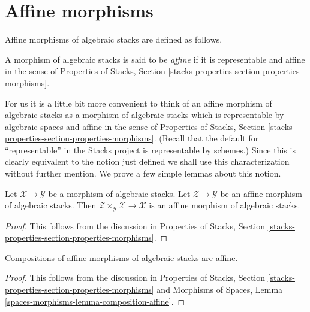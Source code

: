 \section{Affine morphisms}
\label{section-affine}

\noindent
Affine morphisms of algebraic stacks are defined as follows.

\begin{definition}
\label{definition-affine}
A morphism of algebraic stacks is said to be {\it affine}
if it is representable and affine in the sense of
Properties of Stacks, Section
\ref{stacks-properties-section-properties-morphisms}.
\end{definition}

\noindent
For us it is a little bit more convenient to think of an affine
morphism of algebraic stacks as a morphism of algebraic stacks which is
representable by algebraic spaces and affine in the sense of
Properties of Stacks, Section
\ref{stacks-properties-section-properties-morphisms}.
(Recall that the default for ``representable'' in the Stacks project
is representable by schemes.)
Since this is clearly equivalent to the notion just defined we shall
use this characterization without further mention.
We prove a few simple lemmas about this notion.

\begin{lemma}
\label{lemma-base-change-affine}
Let $\mathcal{X} \to \mathcal{Y}$ be a morphism of algebraic stacks.
Let $\mathcal{Z} \to \mathcal{Y}$ be an affine morphism of algebraic
stacks. Then $\mathcal{Z} \times_\mathcal{Y} \mathcal{X} \to \mathcal{X}$
is an affine morphism of algebraic stacks.
\end{lemma}

\begin{proof}
This follows from the discussion in
Properties of Stacks, Section
\ref{stacks-properties-section-properties-morphisms}.
\end{proof}

\begin{lemma}
\label{lemma-composition-affine}
Compositions of affine morphisms of algebraic stacks are affine.
\end{lemma}

\begin{proof}
This follows from the discussion in
Properties of Stacks, Section
\ref{stacks-properties-section-properties-morphisms}
and
Morphisms of Spaces, Lemma \ref{spaces-morphisms-lemma-composition-affine}.
\end{proof}

